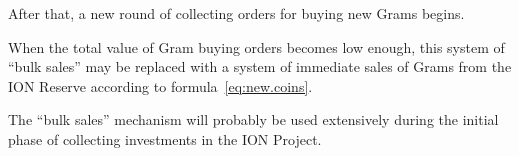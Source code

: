 \documentclass[12pt,oneside]{article}
\begin{document}
After that, a new round of collecting orders for buying new Grams
begins.

When the total value of Gram buying orders becomes low enough, this
system of ``bulk sales'' may be replaced with a system of immediate
sales of Grams from the ION Reserve according to
formula~\eqref{eq:new.coins}.

The ``bulk sales'' mechanism will probably be used extensively during
the initial phase of collecting investments in the ION Project.
\end{document}
